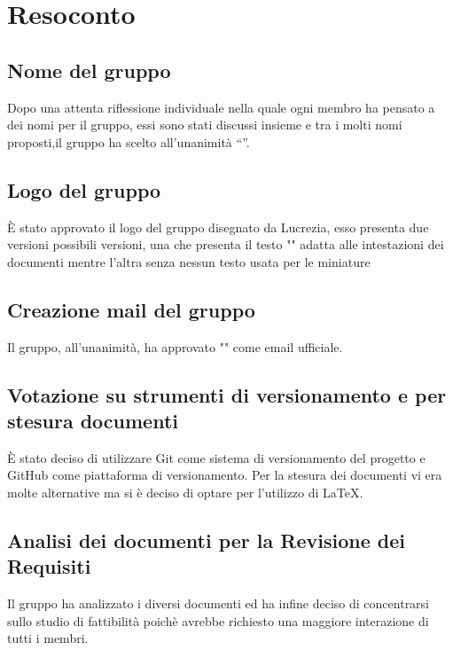 \newpage

\section{Resoconto}

\subsection{Nome del gruppo}

Dopo una attenta riflessione individuale nella quale ogni membro ha pensato a dei nomi per il gruppo, essi sono stati discussi insieme e tra i molti nomi proposti,il gruppo ha scelto all’unanimità “\textit{\Gruppo{}}”.

\subsection{Logo del gruppo}

È stato approvato il logo del gruppo disegnato da Lucrezia, esso presenta due versioni possibili versioni, una che presenta il testo "\Gruppo{}" adatta alle intestazioni dei documenti mentre l'altra senza nessun testo usata per le miniature

\subsection{Creazione mail del gruppo}

Il gruppo, all'unanimità, ha approvato "\textit{\Mail{}}" come email ufficiale.

\subsection{Votazione su strumenti di versionamento e per stesura documenti}

È stato deciso di utilizzare Git come sistema di versionamento del progetto e GitHub come piattaforma di versionamento. Per la stesura dei documenti vi era molte alternative ma si è deciso di optare per l'utilizzo di \LaTeX.


\subsection{Analisi dei documenti per la Revisione dei Requisiti}

Il gruppo ha analizzato i diversi documenti ed ha infine deciso di concentrarsi sullo studio di fattibilità poichè avrebbe richiesto una maggiore interazione di tutti i membri.

